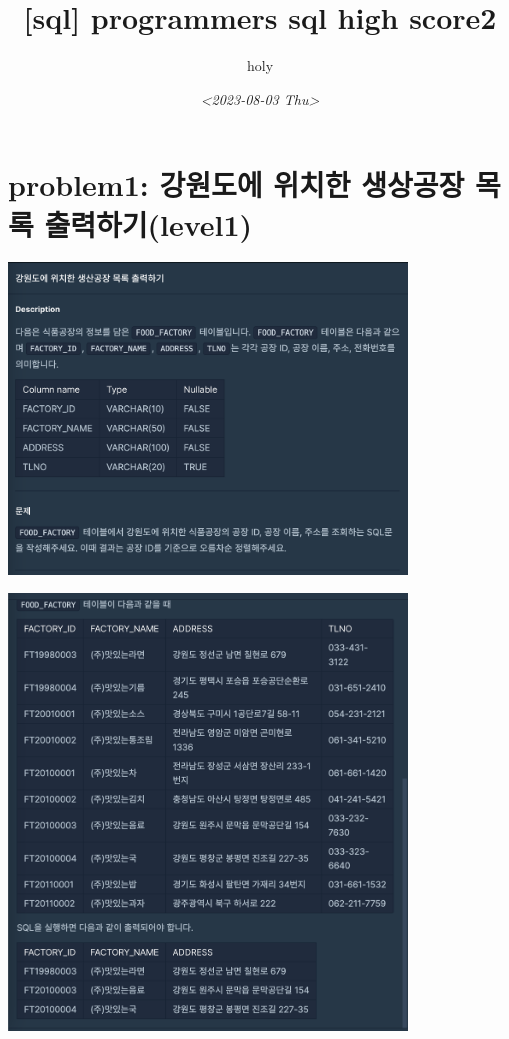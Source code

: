 \documentclass[11pt]{article}
\author{holy}
\date{\textit{<2023-08-03 Thu>}}
\title{[sql] programmers sql high score2}
\begin{document}
\maketitle
\tableofcontents



\section*{problem1: 강원도에 위치한 생상공장 목록 출력하기(level1)}
\label{sec:org4b278c7}
\begin{center}
\includegraphics[width=400px]{../static/img/sql/p1-1.png}
\end{center}
\begin{center}
\includegraphics[width=400px]{../static/img/sql/p1-2.png}
\end{center}
\end{document}
